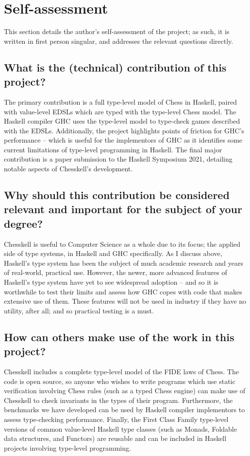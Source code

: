 \section{Self-assessment}

This section details the author's self-assessment of the project; as such, it is written in first person singular, and addresses the relevant questions directly.

\subsection{What is the (technical) contribution of this project?}

The primary contribution is a full type-level model of Chess in Haskell, paired with value-level EDSLs which are typed with the type-level Chess model. The Haskell compiler GHC uses the type-level model to type-check games described with the EDSLs. Additionally, the project highlights points of friction for GHC's performance -- which is useful for the implementors of GHC as it identifies some current limitations of type-level programming in Haskell. The final major contribution is a paper submission to the Haskell Symposium 2021, detailing notable aspects of Chesskell's development.

\subsection{Why should this contribution be considered relevant and important for the subject of your degree?}

Chesskell is useful to Computer Science as a whole due to its focus; the applied side of type systems, in Haskell and GHC specifically. As I discuss above, Haskell's type system has been the subject of much academic research and years of real-world, practical use. However, the newer, more advanced features of Haskell's type system have yet to see widespread adoption -- and so it is worthwhile to test their limits and assess how GHC copes with code that makes extensive use of them. These features will not be used in industry if they have no utility, after all; and so practical testing is a must.

\subsection{How can others make use of the work in this project?}

Chesskell includes a complete type-level model of the FIDE laws of Chess. The code is open source, so anyone who wishes to write programs which use static verification involving Chess rules (such as a typed Chess engine) can make use of Chesskell to check invariants in the types of their program. Furthermore, the benchmarks we have developed can be used by Haskell compiler implementors to assess type-checking performance. Finally, the First Class Family type-level versions of common value-level Haskell type classes (such as Monads, Foldable data structures, and Functors) are reusable and can be included in Haskell projects involving type-level programming.

